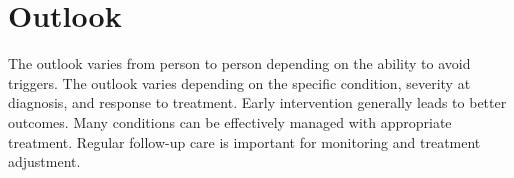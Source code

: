 \section{Outlook}
The outlook varies from person to person depending on the ability to avoid triggers. The outlook varies depending on the specific condition, severity at diagnosis, and response to treatment. Early intervention generally leads to better outcomes. Many conditions can be effectively managed with appropriate treatment. Regular follow-up care is important for monitoring and treatment adjustment.
